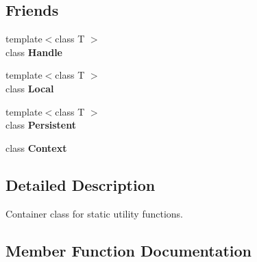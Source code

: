 \subsection*{Friends}
\begin{DoxyCompactItemize}
\item 
\hypertarget{classv8_1_1_v8_a67ca1a2d91273eaf85fb3d23ba8ce984}{}{\footnotesize template$<$class T $>$ }\\class {\bfseries Handle}\label{classv8_1_1_v8_a67ca1a2d91273eaf85fb3d23ba8ce984}

\item 
\hypertarget{classv8_1_1_v8_afb872edb4aac7ba55f0da004113aa2b0}{}{\footnotesize template$<$class T $>$ }\\class {\bfseries Local}\label{classv8_1_1_v8_afb872edb4aac7ba55f0da004113aa2b0}

\item 
\hypertarget{classv8_1_1_v8_afaadbbd2553180545a4e018c3eeac71e}{}{\footnotesize template$<$class T $>$ }\\class {\bfseries Persistent}\label{classv8_1_1_v8_afaadbbd2553180545a4e018c3eeac71e}

\item 
\hypertarget{classv8_1_1_v8_ac26c806e60ca4a0547680edb68f6e39b}{}class {\bfseries Context}\label{classv8_1_1_v8_ac26c806e60ca4a0547680edb68f6e39b}

\end{DoxyCompactItemize}


\subsection{Detailed Description}
Container class for static utility functions. 

\subsection{Member Function Documentation}
\hypertarget{classv8_1_1_v8_a3f70d920e58ac54b56f06363b5130fa3}{}
